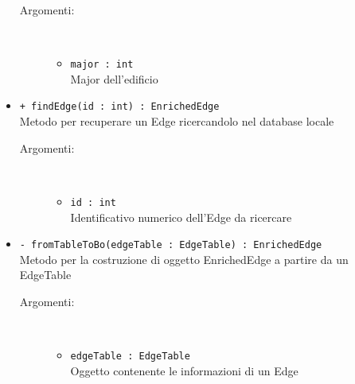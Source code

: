 \documentclass[../DefinizioneDiProdotto.tex]{subfiles}
\begin{document}
\begin{description}
\begin{itemize}
\begin{description}
			\item[Argomenti:] \
			\begin{itemize}
				\item \texttt{major : int}\\
				Major dell'edificio\end{itemize}
		\end{description}
		\item \texttt{+ findEdge(id : int) : EnrichedEdge}\\
		Metodo per recuperare un Edge ricercandolo nel database locale
		\begin{description}
			\item[Argomenti:] \
			\begin{itemize}
				\item \texttt{id : int}\\
				Identificativo numerico dell'Edge da ricercare\end{itemize}
		\end{description}
		\item \texttt{- fromTableToBo(edgeTable : EdgeTable) : EnrichedEdge}\\
		Metodo per la costruzione di oggetto EnrichedEdge a partire da un EdgeTable
		\begin{description}
			\item[Argomenti:] \
			\begin{itemize}
				\item \texttt{edgeTable : EdgeTable}\\
				Oggetto contenente le informazioni di un Edge\end{itemize}
		\end{description}
	\end{itemize}
\end{description}
\end{document}
